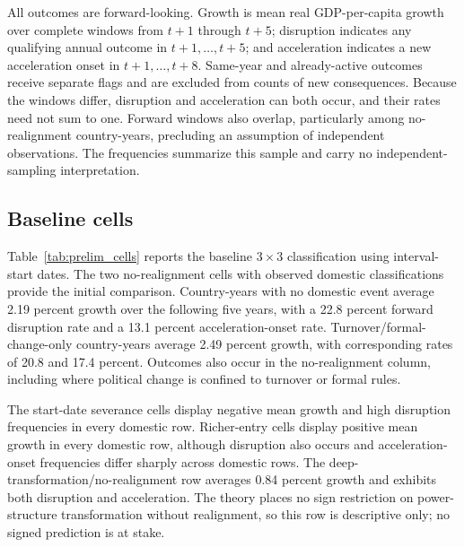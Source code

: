 \documentclass[11pt]{article}
\begin{document}
All outcomes are forward-looking. Growth is mean real GDP-per-capita growth over complete windows from $t+1$ through $t+5$; disruption indicates any qualifying annual outcome in $t+1,\ldots,t+5$; and acceleration indicates a new acceleration onset in $t+1,\ldots,t+8$. Same-year and already-active outcomes receive separate flags and are excluded from counts of new consequences. Because the windows differ, disruption and acceleration can both occur, and their rates need not sum to one. Forward windows also overlap, particularly among no-realignment country-years, precluding an assumption of independent observations. The frequencies summarize this sample and carry no independent-sampling interpretation.

\subsection{Baseline cells}

Table~\ref{tab:prelim_cells} reports the baseline $3\times3$ classification using interval-start dates. The two no-realignment cells with observed domestic classifications provide the initial comparison. Country-years with no domestic event average 2.19 percent growth over the following five years, with a 22.8 percent forward disruption rate and a 13.1 percent acceleration-onset rate. Turnover/formal-change-only country-years average 2.49 percent growth, with corresponding rates of 20.8 and 17.4 percent. Outcomes also occur in the no-realignment column, including where political change is confined to turnover or formal rules.

The start-date severance cells display negative mean growth and high disruption frequencies in every domestic row. Richer-entry cells display positive mean growth in every domestic row, although disruption also occurs and acceleration-onset frequencies differ sharply across domestic rows. The deep-transformation/no-realignment row averages 0.84 percent growth and exhibits both disruption and acceleration. The theory places no sign restriction on power-structure transformation without realignment, so this row is descriptive only; no signed prediction is at stake.
\end{document}
